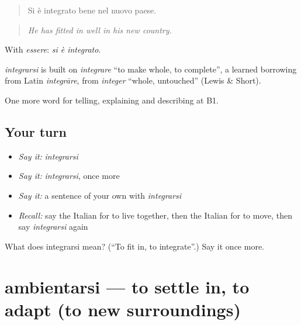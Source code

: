 \begin{quote}
Si è integrato bene nel nuovo paese.
\end{quote}

\begin{quote}
\emph{He has fitted in well in his new country.}
\end{quote}

With \emph{essere}: \emph{si è integrato}.

\begin{cousinweb}
\emph{integrarsi} is built on \emph{integrare} \textquotedblleft{}to make whole, to complete\textquotedblright{}, a learned borrowing from Latin \emph{integrāre}, from \emph{integer} \textquotedblleft{}whole, untouched\textquotedblright{} (Lewis \& Short).
\end{cousinweb}

\begin{grammarlens}[title={What you've built}]
One more word for telling, explaining and describing at B1.
\end{grammarlens}

\subsection*{Your turn}
\begin{itemize}
\raggedright
  \item \emph{Say it:} \emph{integrarsi}
  \item \emph{Say it:} \emph{integrarsi}, once more
  \item \emph{Say it:} a sentence of your own with \emph{integrarsi}
  \item \emph{Recall:} say the Italian for to live together, then the Italian for to move, then say \emph{integrarsi} again
\end{itemize}

\begin{tcolorbox}[breakable,colback=teal!4,colframe=teal!35!black,title={Before you move on}]
What does integrarsi mean? (\textquotedblleft{}To fit in, to integrate\textquotedblright{}.) Say it once more.
\end{tcolorbox}
\section[ambientarsi]{ambientarsi — to settle in, to adapt (to new surroundings)}

\label{lesson:IT-C310-ambientarsi}



